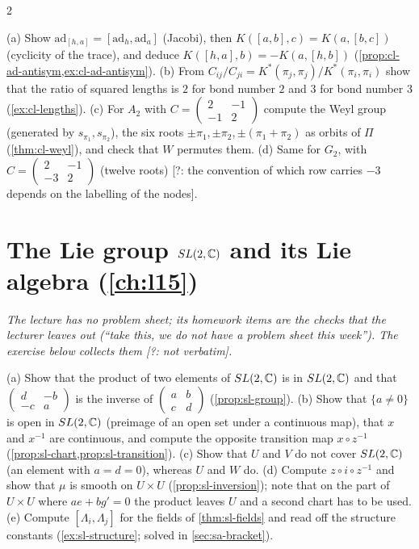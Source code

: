 \begin{paracol}{2}
\begin{exercise}\label{ex:cl-full}
(a) Show $\mathrm{ad}_{[h,a]}=[\mathrm{ad}_h,\mathrm{ad}_a]$ (Jacobi), then $K([a,b],c)=K(a,[b,c])$ (cyclicity of the trace), and deduce $K([h,a],b)=-K(a,[h,b])$ (\cref{prop:cl-ad-antisym,ex:cl-ad-antisym}). (b) From $C_{ij}/C_{ji}=K^*(\pi_j,\pi_j)/K^*(\pi_i,\pi_i)$ show that the ratio of squared lengths is $2$ for bond number $2$ and $3$ for bond number $3$ (\cref{ex:cl-lengths}). (c) For $A_2$ with $C=\begin{pmatrix}2&-1\\-1&2\end{pmatrix}$ compute the Weyl group (generated by $s_{\pi_1},s_{\pi_2}$), the six roots $\pm\pi_1,\pm\pi_2,\pm(\pi_1+\pi_2)$ as orbits of $\Pi$ (\cref{thm:cl-weyl}), and check that $W$ permutes them. (d) Same for $G_2$, with $C=\begin{pmatrix}2&-1\\-3&2\end{pmatrix}$ (twelve roots) [?: the convention of which row carries $-3$ depends on the labelling of the nodes].
\end{exercise}

\section{The Lie group $SL(2,\mathbb{C})$ and its Lie algebra (\cref{ch:l15})}\label{exam:ch15}

\emph{The lecture has no problem sheet; its homework items are the checks that the lecturer leaves out (``take this, we do not have a problem sheet this week''). The exercise below collects them [?: not verbatim].}

\begin{exercise}\label{ex:sl-full}
(a) Show that the product of two elements of $SL(2,\mathbb{C})$ is in $SL(2,\mathbb{C})$ and that $\begin{pmatrix}d&-b\\-c&a\end{pmatrix}$ is the inverse of $\begin{pmatrix}a&b\\c&d\end{pmatrix}$ (\cref{prop:sl-group}). (b) Show that $\{a\ne0\}$ is open in $SL(2,\mathbb{C})$ (preimage of an open set under a continuous map), that $x$ and $x^{-1}$ are continuous, and compute the opposite transition map $x\circ z^{-1}$ (\cref{prop:sl-chart,prop:sl-transition}). (c) Show that $U$ and $V$ do not cover $SL(2,\mathbb{C})$ (an element with $a=d=0$), whereas $U$ and $W$ do. (d) Compute $z\circ i\circ z^{-1}$ and show that $\mu$ is smooth on $U\times U$ (\cref{prop:sl-inversion}); note that on the part of $U\times U$ where $ae+bg'=0$ the product leaves $U$ and a second chart has to be used. (e) Compute $[\Lambda_i,\Lambda_j]$ for the fields of \cref{thm:sl-fields} and read off the structure constants (\cref{ex:sl-structure}; solved in \cref{sec:sa-bracket}).
\end{exercise}


\end{paracol}
